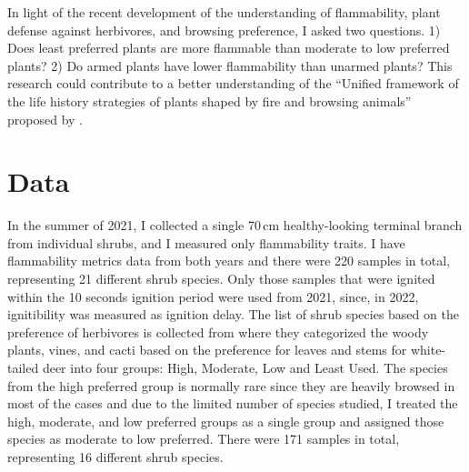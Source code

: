 \documentclass[12pt]{report}
\begin{document}
In light of the recent development of the understanding of flammability, plant defense against herbivores, and browsing preference, I asked two questions. 1) Does least preferred plants are more flammable than moderate to low preferred plants?  2) Do armed plants have lower flammability than unarmed plants? This research could contribute to a better understanding of the ``Unified framework of the life history strategies of plants shaped by fire and browsing animals'' proposed by \citep{archibald2019unified}.


\section{Data}

In the summer of 2021, I collected a single 70\,cm healthy-looking terminal branch from individual shrubs, and I measured only flammability traits.  I have flammability metrics data from both years and there were 220 samples in total, representing 21 different shrub species. Only those samples that were ignited within the 10 seconds ignition period were used from 2021, since, in 2022, ignitibility was measured as ignition delay. The list of shrub species based on the preference of herbivores is collected from \citep{wright2003white} where they categorized the woody plants, vines, and cacti based on the preference for leaves and stems for white-tailed deer into four groups: High, Moderate, Low and Least Used. The species from the high preferred group is normally rare since they are heavily browsed in most of the cases and due to the limited number of species studied, I treated the high, moderate, and low preferred groups as a single group and assigned those species as moderate to low preferred. There were 171 samples in total, representing 16 different shrub species.\\

    
\end{document}
